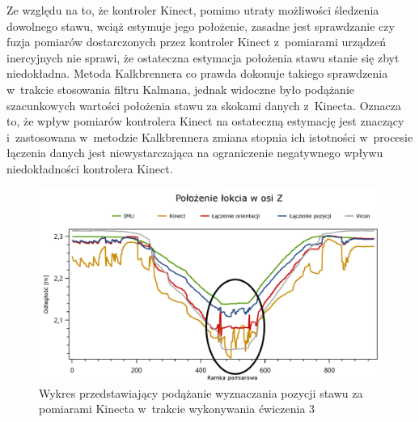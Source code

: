 Ze względu na to, że kontroler Kinect, pomimo utraty możliwości śledzenia dowolnego stawu, wciąż estymuje jego położenie, zasadne jest sprawdzanie czy fuzja pomiarów dostarczonych przez kontroler Kinect z~pomiarami urządzeń inercyjnych nie sprawi, że ostateczna estymacja położenia stawu stanie się zbyt niedokładna. Metoda Kalkbrennera co prawda dokonuje takiego sprawdzenia w~trakcie stosowania filtru Kalmana, jednak widoczne było podążanie szacunkowych wartości położenia stawu za skokami danych z~Kinecta. Oznacza to, że wpływ pomiarów kontrolera Kinect na ostateczną estymację jest znaczący i~zastosowana w~metodzie Kalkbrennera zmiana stopnia ich istotności w~procesie łączenia danych jest niewystarczająca na ograniczenie negatywnego wpływu niedokładności kontrolera Kinect.
\begin{figure}[!htb]
	\centering
	\includegraphics[width=0.8\linewidth]{images/300/Slide3_focus.png}
	\caption{Wykres przedstawiający podążanie wyznaczania pozycji stawu za pomiarami Kinecta w~trakcie wykonywania ćwiczenia 3}
	\label{fig:experiments:sec:follow}
\end{figure}

